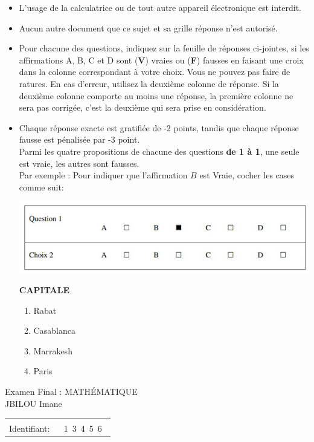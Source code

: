 \documentclass{book}%
\begin{document}
\begin{itemize}%
\item%
L'usage de la calculatrice ou de tout autre appareil électronique est interdit.%
\item%
Aucun autre document que ce sujet et sa grille réponse n'est autorisé.%
\item%
Pour chacune des questions, indiquez sur la feuille de réponses ci-jointes, si les affirmations A, B, C et D sont (\textbf{V}) vraies ou (\textbf{F}) fausses en faisant une croix dans la colonne correspondant à votre choix. Vous ne pouvez pas faire de ratures. En cas d'erreur, utilisez la deuxième colonne de réponse. Si la deuxième colonne comporte au moins une réponse, la première colonne ne sera pas corrigée, c'est la deuxième qui sera prise en considération.%
\item%
Chaque réponse exacte est gratifiée de -2 points, tandis que chaque réponse fausse est pénalisée par -3 point. \\ 	Parmi les quatre propositions de chacune des questions \textbf{de 1 à 1}, une seule est vraie, les autres sont fausses. \\ 	Par exemple : Pour indiquer que l'affirmation $B$ est Vraie, cocher les cases comme suit:  \\ \begin{center}	\includegraphics[scale=0.8]{reponses.png} \end{center}%
\thispagestyle{empty}%
\begin{exercise}%
\textbf{CAPITALE }%
\begin{enumerate}[label=\textbf{\Alph*. }]%
\item%
Rabat%
\item%
Casablanca%
\item%
Marrakesh%
\item%
Paris%
\end{enumerate}%
\end{exercise}%
\end{itemize}%
\newpage%
\thispagestyle{empty}%
Examen Final : MATHÉMATIQUE $\qquad \qquad \qquad \qquad \qquad \qquad \qquad \qquad$ JBILOU Imane%
\begin{flushright}%
\begin{tabular}{|l|}%
\hline%
 \\%
\thispagestyle{empty}%
Identifiant: $\quad$ {\Large 1~3~4~5~6~}%
 \\%
\hline%
\end{tabular}%
\end{flushright}%
\end{document}
